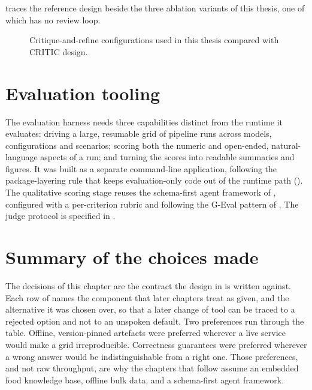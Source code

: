  traces the reference design beside the three ablation variants of this thesis, one of which has no review loop.

\begin{figure}[htbp]
    \centering
    \resizebox{\textwidth}{!}{}
    \caption{Critique-and-refine configurations used in this thesis compared with CRITIC design.}
    \label{fig:diagram-self-correction}
\end{figure}

\section{Evaluation tooling}
\label{sec:tools-evaluation}

The evaluation harness needs three capabilities distinct from the runtime it evaluates: driving a large, resumable grid of pipeline runs across models, configurations and scenarios; scoring both the numeric and open-ended, natural-language aspects of a run; and turning the scores into readable summaries and figures. It was built as a separate command-line application, following the package-layering rule that keeps evaluation-only code out of the runtime path (). The qualitative scoring stage reuses the schema-first agent framework of , configured with a per-criterion rubric and following the G-Eval pattern of . The judge protocol is specified in .

\section{Summary of the choices made}
\label{sec:tools-summary}

The decisions of this chapter are the contract the design in  is written against. Each row of  names the component that later chapters treat as given, and the alternative it was chosen over, so that a later change of tool can be traced to a rejected option and not to an unspoken default. Two preferences run through the table. Offline, version-pinned artefacts were preferred wherever a live service would make a grid irreproducible. Correctness guarantees were preferred wherever a wrong answer would be indistinguishable from a right one. Those preferences, and not raw throughput, are why the chapters that follow assume an embedded food knowledge base, offline bulk data, and a schema-first agent framework.

\begin{table}[htbp]
    \centering
    \small
    
    \caption{Technology decisions carried into .}
    \label{tab:tool-choices}
\end{table}
